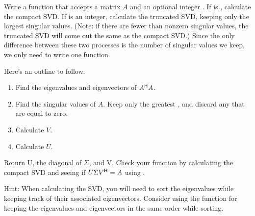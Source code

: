 \begin{problem}
Write a function  that accepts a matrix $A$ and an optional integer .
If  is , calculate the compact SVD. If  is an integer, calculate the truncated SVD, keeping only the  largest singular values.
(Note: if there are fewer than  nonzero singular values, the truncated SVD will come out the same as the compact SVD.)
Since the only difference between these two processes is the number of singular values we keep, we only need to write one function.

Here's an outline to follow:

\begin{enumerate}
\item Find the eigenvalues and eigenvectors of $A^{\mathsf H} A$.
\item Find the singular values of $A$. Keep only the greatest , and discard any that are equal to zero.
\item Calculate $V$.
\item Calculate $U$.
\end{enumerate}

Return U, the diagonal of $\Sigma$, and V.
Check your function by calculating the compact SVD and seeing if $U\Sigma V^{\mathsf H} = A$ using .

Hint: When calculating the SVD, you will need to sort the eigenvalues while keeping track of their associated eigenvectors.
Consider using the function  for keeping the eigenvalues and eigenvectors in the same order while sorting.
\label{prob:calc_svd}
\end{problem}

